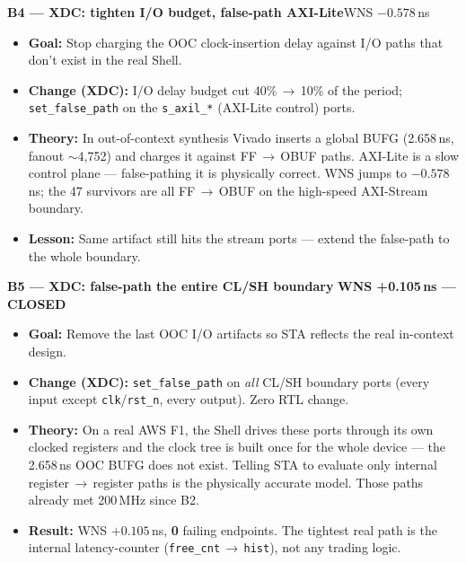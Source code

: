 \documentclass[10pt,a4paper]{article}
\begin{document}
{\bfseries\color{accentteal} B4 — XDC: tighten I/O budget, false-path AXI-Lite}\quad WNS $-0.578$\,ns
\begin{itemize}[leftmargin=1.2em, itemsep=1pt, topsep=2pt]
  \item \textbf{Goal:} Stop charging the OOC clock-insertion delay against I/O
        paths that don't exist in the real Shell.
  \item \textbf{Change (XDC):} I/O delay budget cut 40\%\,$\to$\,10\% of the
        period; \texttt{set\_false\_path} on the \texttt{s\_axil\_*} (AXI-Lite
        control) ports.
  \item \textbf{Theory:} In out-of-context synthesis Vivado inserts a global BUFG
        (2.658\,ns, fanout $\sim$4{,}752) and charges it against FF\,$\to$\,OBUF
        paths. AXI-Lite is a slow control plane — false-pathing it is physically
        correct. WNS jumps to $-0.578$\,ns; the 47 survivors are all
        FF\,$\to$\,OBUF on the high-speed AXI-Stream boundary.
  \item \textbf{Lesson:} Same artifact still hits the stream ports — extend the
        false-path to the whole boundary.
\end{itemize}

\begin{changebox}
{\bfseries\color{newtext} B5 — XDC: false-path the entire CL/SH boundary}\quad
\textcolor{okgreen}{\textbf{WNS +0.105\,ns — CLOSED}}
\begin{itemize}[leftmargin=1.2em, itemsep=1pt, topsep=2pt]
  \item \textbf{Goal:} Remove the last OOC I/O artifacts so STA reflects the real
        in-context design.
  \item \textbf{Change (XDC):} \texttt{set\_false\_path} on \emph{all} CL/SH
        boundary ports (every input except \texttt{clk}/\texttt{rst\_n}, every
        output). Zero RTL change.
  \item \textbf{Theory:} On a real AWS F1, the Shell drives these ports through
        its own clocked registers and the clock tree is built once for the whole
        device — the 2.658\,ns OOC BUFG does not exist. Telling STA to evaluate
        only internal register\,$\to$\,register paths is the physically accurate
        model. Those paths already met 200\,MHz since B2.
  \item \textbf{Result:} WNS $+0.105$\,ns, \textbf{0} failing endpoints. The
        tightest real path is the internal latency-counter
        (\texttt{free\_cnt}\,$\to$\,\texttt{hist}), not any trading logic.
\end{itemize}
\end{changebox}
\end{document}
